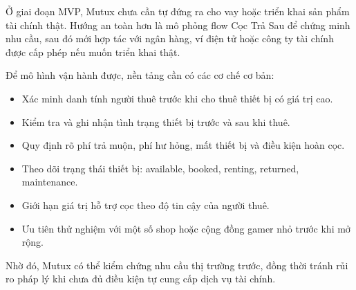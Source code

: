 Ở giai đoạn MVP, Mutux chưa cần tự đứng ra cho vay hoặc triển khai sản phẩm tài chính thật. Hướng an toàn hơn là mô phỏng flow Cọc Trả Sau để chứng minh nhu cầu, sau đó mới hợp tác với ngân hàng, ví điện tử hoặc công ty tài chính được cấp phép nếu muốn triển khai thật.

Để mô hình vận hành được, nền tảng cần có các cơ chế cơ bản:

\begin{itemize}
    \item Xác minh danh tính người thuê trước khi cho thuê thiết bị có giá trị cao.
    \item Kiểm tra và ghi nhận tình trạng thiết bị trước và sau khi thuê.
    \item Quy định rõ phí trả muộn, phí hư hỏng, mất thiết bị và điều kiện hoàn cọc.
    \item Theo dõi trạng thái thiết bị: available, booked, renting, returned, maintenance.
    \item Giới hạn giá trị hỗ trợ cọc theo độ tin cậy của người thuê.
    \item Ưu tiên thử nghiệm với một số shop hoặc cộng đồng gamer nhỏ trước khi mở rộng.
\end{itemize}

Nhờ đó, Mutux có thể kiểm chứng nhu cầu thị trường trước, đồng thời tránh rủi ro pháp lý khi chưa đủ điều kiện tự cung cấp dịch vụ tài chính.
